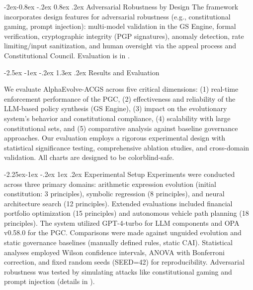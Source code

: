\documentclass[manuscript,screen,review,anonymous,9pt]{acmart}
\makeatletter
\renewcommand\section{\@startsection{section}{1}{\z@}%
  {-2.5ex \@plus -1ex \@minus -.2ex}%
  {1.3ex \@plus.2ex}%
  {\normalfont\Large\bfseries}}
\renewcommand\subsection{\@startsection{subsection}{2}{\z@}%
  {-2.25ex\@plus -1ex \@minus -.2ex}%
  {1ex \@plus .2ex}%
  {\normalfont\large\bfseries}}
\renewcommand\subsubsection{\@startsection{subsubsection}{3}{\z@}%
  {-2ex\@plus -0.8ex \@minus -.2ex}%
  {0.8ex \@plus .2ex}%
  {\normalfont\normalsize\bfseries}}
\makeatother
\begin{document}
\subsubsection{Adversarial Robustness by Design}
\label{subsubsec:adversarial_robustness_methods}
The framework incorporates design features for adversarial robustness (e.g., constitutional gaming, prompt injection): multi-model validation in the GS Engine, formal verification, cryptographic integrity (PGP signatures), anomaly detection, rate limiting/input sanitization, and human oversight via the appeal process and Constitutional Council. Evaluation is in .

\section{Results and Evaluation}
\label{sec:results}

We evaluate AlphaEvolve-ACGS across five critical dimensions: (1) real-time enforcement performance of the PGC, (2) effectiveness and reliability of the LLM-based policy synthesis (GS Engine), (3) impact on the evolutionary system's behavior and constitutional compliance, (4) scalability with large constitutional sets, and (5) comparative analysis against baseline governance approaches. Our evaluation employs a rigorous experimental design with statistical significance testing, comprehensive ablation studies, and cross-domain validation. All charts are designed to be colorblind-safe.

\subsection{Experimental Setup}
\label{subsec:experimental_setup}
Experiments were conducted across three primary domains: arithmetic expression evolution (initial constitution: 3 principles), symbolic regression (8 principles), and neural architecture search (12 principles). Extended evaluations included financial portfolio optimization (15 principles) and autonomous vehicle path planning (18 principles). The system utilized GPT-4-turbo for LLM components and OPA v0.58.0 for the PGC. Comparisons were made against unguided evolution and static governance baselines (manually defined rules, static CAI). Statistical analyses employed Wilson confidence intervals, ANOVA with Bonferroni correction, and fixed random seeds (SEED=42) for reproducibility. Adversarial robustness was tested by simulating attacks like constitutional gaming and prompt injection (details in ).
\end{document}
